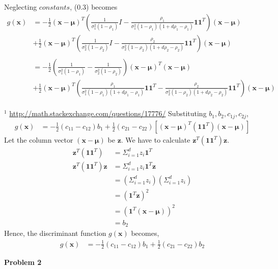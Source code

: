\documentclass[12pt]{article}
\numberwithin{equation}{section}
\numberwithin{figure}{section}
\numberwithin{table}{section}
\renewcommand{\vec}[1]{\mathbf{#1}}
\begin{document}
Neglecting $constants$, (0.3) becomes
\begin{align}
g(\vec{x}) & = -\frac{1}{2}(\vec{x}-\vec{\mu})^{T}(\frac{1}{\sigma_{1}^{2}(1-\rho_{1})}I - \frac{\rho_{1}}{\sigma_{1}^{2}(1-\rho_{1})(1+d\rho_{1}-\rho_{1})}\vec{1}\vec{1}^{T})(\vec{x}-\vec{\mu}) 
\\
& + \frac{1}{2}(\vec{x}-\vec{\mu})^{T}(\frac{1}{\sigma_{2}^{2}(1-\rho_{2})}I - \frac{\rho_{2}}{\sigma_{2}^{2}(1-\rho_{2})(1+d\rho_{2}-\rho_{2})}\vec{1}\vec{1}^{T})(\vec{x}-\vec{\mu}) \\\\
&= -\frac{1}{2}(\frac{1}{\sigma_{1}^{2}(1-\rho_{1})}-\frac{1}{\sigma_{2}^{2}(1-\rho_{2})})(\vec{x}-\vec{\mu})^{T}(\vec{x}-\vec{\mu})\\
& + \frac{1}{2}(\vec{x}-\vec{\mu})^{T}(\frac{\rho_{1}}{\sigma_{1}^{2}(1-\rho_{1})(1+d\rho_{1}-\rho_{1})}\vec{1}\vec{1}^{T} - \frac{\rho_{2}}{\sigma_{2}^{2}(1-\rho_{2})(1+d\rho_{2}-\rho_{2})}\vec{1}\vec{1}^{T})(\vec{x}-\vec{\mu})
\end{align}\\
\vspace{1.6cm}
\small{$^{1}$ \url{http://math.stackexchange.com/questions/17776/}}
\newpage
\normalsize
Substituting $b_{1}, b_{2}, c_{1j}, c_{2j}$,
\begin{align}
g(\vec{x}) &= -\frac{1}{2}(c_{11}-c_{12})b_{1}
			+ \frac{1}{2}(c_{21}-c_{22})[(\vec{x}-\vec{\mu})^{T}(\vec{1}\vec{1}^{T})(\vec{x}-\vec{\mu})]
\end{align}
Let the column vector $(\vec{x}-\vec{\mu})$ be $\vec{z}$. We have to calculate $\vec{z}^{T}(\vec{1}\vec{1}^{T})\vec{z}$.
\begin{align}
\vec{z}^{T}(\vec{1}\vec{1}^{T}) &= \varSigma_{i=1}^{d}z_{i} \vec{1}^{T}\\
\vec{z}^{T}(\vec{1}\vec{1}^{T})\vec{z} &=\varSigma_{i=1}^{d}z_{i} \vec{1}^{T}\vec{z}\\
&=(\varSigma_{i=1}^{d}z_{i})(\varSigma_{i=1}^{d}z_{i})\\
&=(\vec{1}^{T}\vec{z})^{2}\\
&=(\vec{1}^{T}(\vec{x}-\vec{\mu}))^{2}\\
&=b_{2}
\end{align}
Hence, the discriminant function $g(\vec{x})$ becomes,
{\large\begin{align}
g(\vec{x})&=-\frac{1}{2}(c_{11} - c_{12})b_{1} + \frac{1}{2}(c_{21}-c_{22})b_{2} 
\end{align}}

\newpage
\normalsize
{\bf Problem 2}
\bigskip
\end{document}

